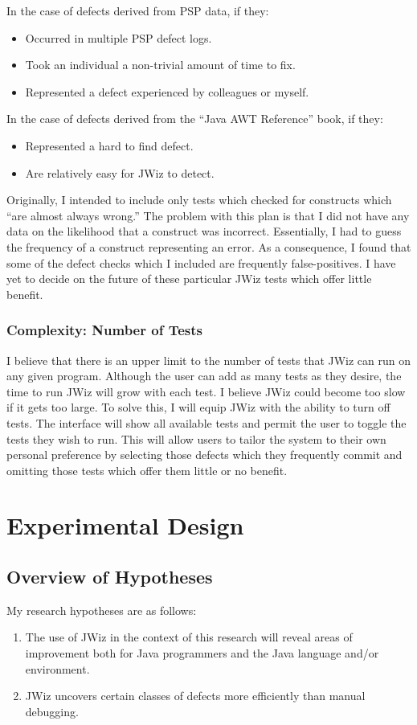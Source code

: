 In the case of defects derived from PSP data, if they:
\begin{itemize}
\item Occurred in multiple PSP defect logs.
\item Took an individual a non-trivial amount of time to fix.
\item Represented a defect experienced by colleagues or myself.
\end{itemize}

In the case of defects derived from the ``Java AWT Reference'' book, if they:
\begin{itemize}
\item Represented a hard to find defect.
\item Are relatively easy for JWiz to detect.
\end{itemize}

Originally, I intended to include only tests which checked for constructs
which ``are almost always wrong.''  The problem with this plan is that I
did not have any data on the likelihood that a construct was incorrect.
Essentially, I had to guess the frequency of a construct representing an
error.  As a consequence, I found that some of the defect checks which I
included are frequently false-positives.  I have yet to decide on the
future of these particular JWiz tests which offer little benefit.

\subsection{Complexity: Number of Tests}
I believe that there is an upper limit to the number of tests that JWiz can
run on any given program.  Although the user can add as many tests as they
desire, the time to run JWiz will grow with each test.  I believe JWiz
could become too slow if it gets too large.  To solve this, I will equip
JWiz with the ability to turn off tests.  The interface will show all
available tests and permit the user to toggle the tests they wish to run.
This will allow users to tailor the system to their own personal preference
by selecting those defects which they frequently commit and omitting those
tests which offer them little or no benefit.

\chapter{Experimental Design}

\section{Overview of Hypotheses}
My research hypotheses are as follows:
\begin{enumerate}
\item The use of JWiz in the context of this research will reveal areas of
  improvement both for Java programmers and the Java language and/or
  environment.
\item JWiz uncovers certain classes of defects more efficiently than manual
debugging.
\end{enumerate}

